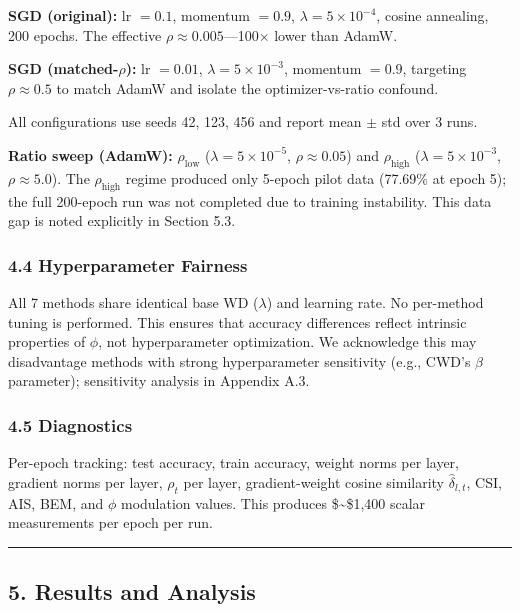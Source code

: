 \documentclass[
]{article}
\begin{document}
\textbf{SGD (original):} lr \(= 0.1\), momentum \(= 0.9\),
\(\lambda = 5 \times 10^{-4}\), cosine annealing, 200 epochs. The
effective \(\rho \approx 0.005\)---100\(\times\) lower than AdamW.

\textbf{SGD (matched-\(\rho\)):} lr \(= 0.01\),
\(\lambda = 5 \times 10^{-3}\), momentum \(= 0.9\), targeting
\(\rho \approx 0.5\) to match AdamW and isolate the optimizer-vs-ratio
confound.

All configurations use seeds 42, 123, 456 and report mean \(\pm\) std
over 3 runs.

\textbf{Ratio sweep (AdamW):} \(\rho_{\text{low}}\)
(\(\lambda = 5 \times 10^{-5}\), \(\rho \approx 0.05\)) and
\(\rho_{\text{high}}\) (\(\lambda = 5 \times 10^{-3}\),
\(\rho \approx 5.0\)). The \(\rho_{\text{high}}\) regime produced only
5-epoch pilot data (77.69\% at epoch 5); the full 200-epoch run was not
completed due to training instability. This data gap is noted explicitly
in Section 5.3.

\hypertarget{hyperparameter-fairness}{%
\subsubsection{4.4 Hyperparameter
Fairness}\label{hyperparameter-fairness}}

All 7 methods share identical base WD (\(\lambda\)) and learning rate.
No per-method tuning is performed. This ensures that accuracy
differences reflect intrinsic properties of \(\phi\), not hyperparameter
optimization. We acknowledge this may disadvantage methods with strong
hyperparameter sensitivity (e.g., CWD's \(\beta\) parameter);
sensitivity analysis in Appendix A.3.

\hypertarget{diagnostics}{%
\subsubsection{4.5 Diagnostics}\label{diagnostics}}

Per-epoch tracking: test accuracy, train accuracy, weight norms per
layer, gradient norms per layer, \(\rho_t\) per layer, gradient-weight
cosine similarity \(\hat{\delta}_{l,t}\), CSI, AIS, BEM, and \(\phi\)
modulation values. This produces \$\sim\$1,400 scalar measurements per
epoch per run.

\begin{center}\rule{0.5\linewidth}{0.5pt}\end{center}

\hypertarget{results-and-analysis}{%
\subsection{5. Results and Analysis}\label{results-and-analysis}}
\end{document}
